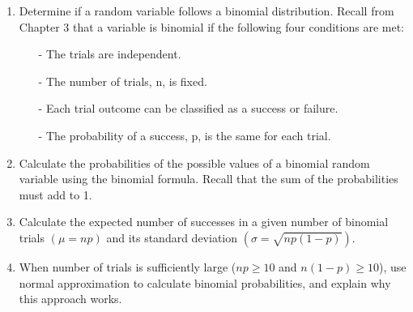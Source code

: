 \documentclass[11pt]{article}
\begin{document}
\begin{enumerate}[resume]
\renewcommand\labelenumi{\textcolor{oiB}{\textbf{LO \theenumi.}}}

%
%
\item Determine if a random variable follows a binomial distribution.  Recall from Chapter 3 that a variable is binomial if the following four conditions are met:
\begin{itemize}
\item[-] The trials are independent. 
\item[-] The number of trials, n, is fixed. 
\item[-] Each trial outcome can be classified as a success or failure. 
\item[-] The probability of a success, p, is the same for each trial. 
\end{itemize}

\item Calculate the probabilities of the possible values of a binomial random variable using the binomial formula.  Recall that the sum of the probabilities must add to 1.

\item Calculate the expected number of successes in a given number of binomial trials $(\mu = np)$ and its standard deviation $(\sigma = \sqrt{np(1-p)})$.

\item When number of trials is sufficiently large ($np \ge 10$ and $n(1-p) \ge 10$), use normal approximation to calculate binomial probabilities, and explain why this approach works.

\end{enumerate}
\end{document}
